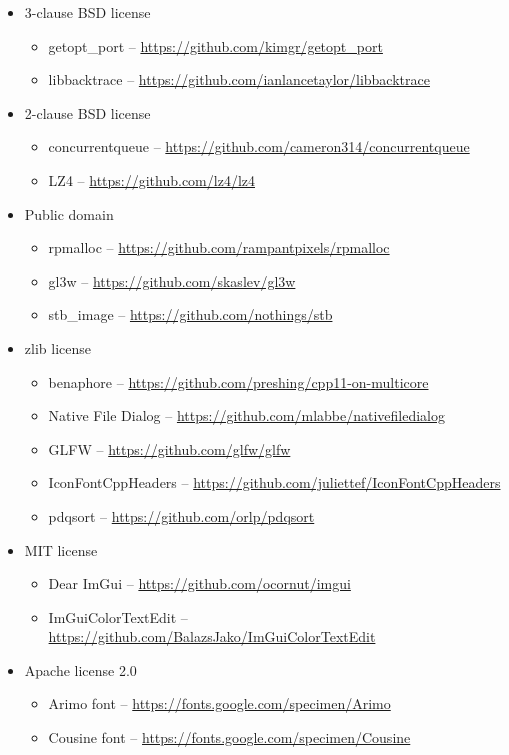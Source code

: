 \documentclass[hidelinks,titlepage,a4paper]{article}
\begin{document}
\begin{itemize}
\item 3-clause BSD license
\begin{itemize}
\item getopt\_port -- \url{https://github.com/kimgr/getopt\_port}
\item libbacktrace -- \url{https://github.com/ianlancetaylor/libbacktrace}
\end{itemize}

\item 2-clause BSD license
\begin{itemize}
\item concurrentqueue -- \url{https://github.com/cameron314/concurrentqueue}
\item LZ4 -- \url{https://github.com/lz4/lz4}
\end{itemize}

\item Public domain
\begin{itemize}
\item rpmalloc -- \url{https://github.com/rampantpixels/rpmalloc}
\item gl3w -- \url{https://github.com/skaslev/gl3w}
\item stb\_image -- \url{https://github.com/nothings/stb}
\end{itemize}

\item zlib license
\begin{itemize}
\item benaphore -- \url{https://github.com/preshing/cpp11-on-multicore}
\item Native File Dialog -- \url{https://github.com/mlabbe/nativefiledialog}
\item GLFW -- \url{https://github.com/glfw/glfw}
\item IconFontCppHeaders -- \url{https://github.com/juliettef/IconFontCppHeaders}
\item pdqsort -- \url{https://github.com/orlp/pdqsort}
\end{itemize}

\item MIT license
\begin{itemize}
\item Dear ImGui -- \url{https://github.com/ocornut/imgui}
\item ImGuiColorTextEdit -- \url{https://github.com/BalazsJako/ImGuiColorTextEdit}
\end{itemize}

\item Apache license 2.0
\begin{itemize}
\item Arimo font -- \url{https://fonts.google.com/specimen/Arimo}
\item Cousine font -- \url{https://fonts.google.com/specimen/Cousine}
\end{itemize}


\end{itemize}
\end{document}

